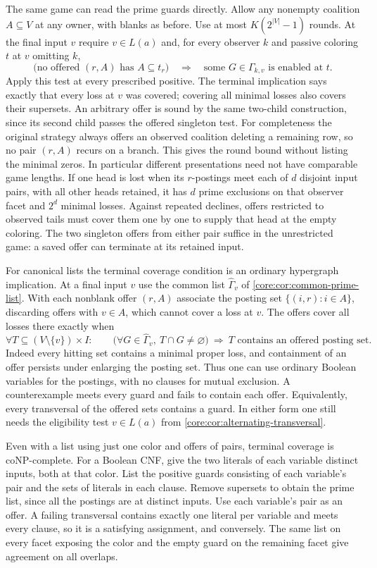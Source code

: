 The same game can read the prime guards directly. Allow any nonempty
coalition $A\subseteq V$ at any owner, with blanks as before. Use
at most $K(2^{|V|}-1)$ rounds. At the final input $v$ require
$v\in L(a)$ and, for every observer $k$ and passive coloring $t$
at $v$ omitting $k$,
\[
 \bigl(\text{no offered }(r,A)\text{ has }A\subseteq t_r\bigr)
 \quad\Longrightarrow\quad
 \text{some }G\in\Gamma_{k,v}\text{ is enabled at }t .
\]
Apply this test at every prescribed positive. The terminal implication
says exactly that every loss at $v$ was covered; covering all minimal
losses also covers their supersets. An arbitrary offer is sound by
the same two-child construction, since its second child passes the
offered singleton test. For completeness the original strategy
always offers an observed coalition deleting a remaining row,
so no pair $(r,A)$ recurs on a branch. This gives the round bound
without listing the minimal zeros. In particular different
presentations need not have comparable game lengths. If one head
is lost when its $r$-postings meet each of $d$ disjoint input pairs,
with all other heads retained, it has $d$ prime exclusions on that
observer facet and $2^d$ minimal losses. Against repeated declines,
offers restricted to observed tails must cover them one by one to
supply that head at the empty coloring. The two singleton offers
from either pair suffice in the unrestricted game: a saved offer
can terminate at its retained input.

For canonical lists the terminal coverage condition is an ordinary
hypergraph implication. At a final input $v$ use the common list
$\widehat\Gamma_v$ of \cref{core:cor:common-prime-list}. With each
nonblank offer $(r,A)$ associate the posting set
$\{(i,r):i\in A\}$, discarding offers with $v\in A$, which cannot cover
a loss at $v$. The offers cover all losses there exactly when
\[
 \forall T\subseteq (V\setminus\{v\})\times I:\qquad
 \bigl(\forall G\in\widehat\Gamma_v,\ T\cap G\ne\varnothing\bigr)
 \ \Longrightarrow\ \text{$T$ contains an offered posting set}.
\]
Indeed every hitting set contains a minimal proper loss, and containment
of an offer persists under enlarging the posting set. Thus one can use
ordinary Boolean variables for the postings, with no clauses for
mutual exclusion. A counterexample meets every guard and fails to
contain each offer. Equivalently, every transversal of the offered
sets contains a guard. In either form one still needs the eligibility
test $v\in L(a)$ from \cref{core:cor:alternating-transversal}.

Even with a list using just one color and offers of pairs, terminal
coverage is coNP-complete. For a Boolean CNF, give the two literals of
each variable distinct inputs, both at that color. List the positive
guards consisting of each variable's pair and the sets of literals in
each clause. Remove supersets to obtain the prime list, since all the
postings are at distinct inputs. Use each variable's pair as an offer.
A failing transversal contains exactly one literal per variable and
meets every clause, so it is a satisfying assignment, and conversely.
The same list on every facet exposing the color and the empty guard on
the remaining facet give agreement on all overlaps.

